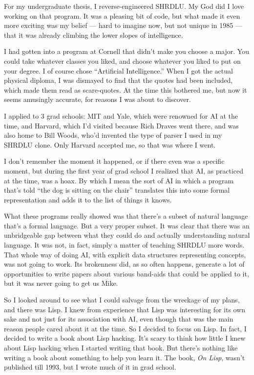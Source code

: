 \documentclass[12pt]{book}
\begin{document}
For my undergraduate thesis, I reverse-engineered SHRDLU. My God did I
love working on that program. It was a pleasing bit of code, but what
made it even more exciting was my belief --- hard to imagine now, but
not unique in 1985 --- that it was already climbing the lower slopes of
intelligence.

I had gotten into a program at Cornell that didn't make you choose a
major. You could take whatever classes you liked, and choose whatever
you liked to put on your degree. I of course chose ``Artificial
Intelligence.'' When I got the actual physical diploma, I was dismayed
to find that the quotes had been included, which made them read as
scare-quotes. At the time this bothered me, but now it seems amusingly
accurate, for reasons I was about to discover.

I applied to 3 grad schools: MIT and Yale, which were renowned for AI at
the time, and Harvard, which I'd visited because Rich Draves went there,
and was also home to Bill Woods, who'd invented the type of parser I
used in my SHRDLU clone. Only Harvard accepted me, so that was where I
went.

I don't remember the moment it happened, or if there even was a specific
moment, but during the first year of grad school I realized that AI, as
practiced at the time, was a hoax. By which I mean the sort of AI in
which a program that's told ``the dog is sitting on the chair''
translates this into some formal representation and adds it to the list
of things it knows.

What these programs really showed was that there's a subset of natural
language that's a formal language. But a very proper subset. It was
clear that there was an unbridgeable gap between what they could do and
actually understanding natural language. It was not, in fact, simply a
matter of teaching SHRDLU more words. That whole way of doing AI, with
explicit data structures representing concepts, was not going to work.
Its brokenness did, as so often happens, generate a lot of opportunities
to write papers about various band-aids that could be applied to it, but
it was never going to get us Mike.

So I looked around to see what I could salvage from the wreckage of my
plans, and there was Lisp. I knew from experience that Lisp was
interesting for its own sake and not just for its association with AI,
even though that was the main reason people cared about it at the time.
So I decided to focus on Lisp. In fact, I decided to write a book about
Lisp hacking. It's scary to think how little I knew about Lisp hacking
when I started writing that book. But there's nothing like writing a
book about something to help you learn it. The book, \emph{On Lisp},
wasn't published till 1993, but I wrote much of it in grad school.
\end{document}
